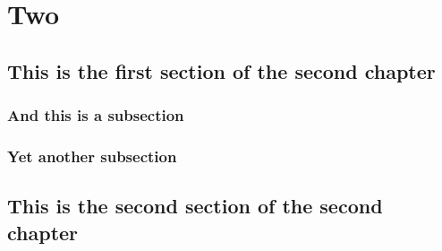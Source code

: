 \documentclass[a4paper, twoside, openright, 12pt]{bhamthesis}
\begin{document}
\lipsum[8-10]

\chapter{Two}%
\label{chap:two}
\thispagestyle{empty}

\lipsum[11]

\section{This is the first section of the second chapter}%
\label{sec:two:section_one}

\lipsum[12-13]

\subsection{And this is a subsection}%
\label{subsec:two:section_one:subsec_one}

\lipsum[14-15]

\subsection{Yet another subsection}%
\label{subsec:two:section_one:subsec_two}

\lipsum[16-18]

\section{This is the second section of the second chapter}%
\label{sec:two:section_two}

\lipsum[19-20]




\end{document}
